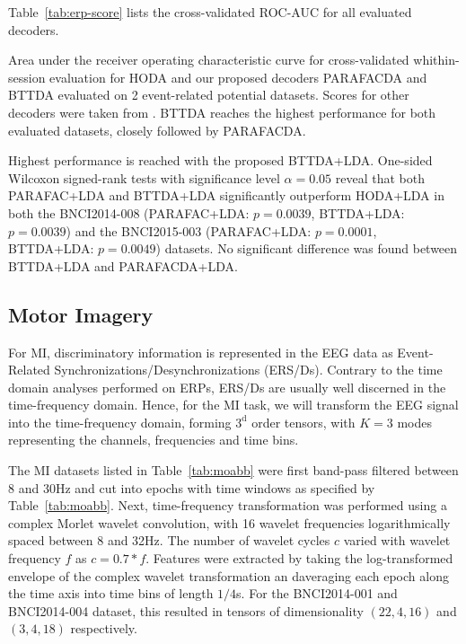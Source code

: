 Table~\ref{tab:erp-score} lists the cross-validated ROC-AUC for all evaluated
decoders.
\begin{table}[t]
	\footnotesize
	\centering
	
  \caption[Whithin-session classification score for 2 event-related potential
  datasets.]{Area under the receiver operating characteristic curve for
		cross-validated whithin-session evaluation for HODA and our proposed decoders
		PARAFACDA and BTTDA evaluated on 2 event-related potential datasets.
    Scores for other decoders were taken from \cite{Chevallier2024}.
		BTTDA reaches the highest performance for both evaluated datasets, closely
		followed by PARAFACDA.
	}
	\label{tab:erp-score}
\end{table}
Highest performance is reached with the proposed BTTDA+LDA.
One-sided Wilcoxon signed-rank tests with significance level $\alpha=0.05$ reveal that both PARAFAC+LDA and BTTDA+LDA
significantly outperform HODA+LDA in both the BNCI2014-008 (PARAFAC+LDA:
$p=0.0039$, BTTDA+LDA: $p=0.0039$) and the BNCI2015-003 (PARAFAC+LDA:
$p=0.0001$, BTTDA+LDA: $p=0.0049$) datasets.
No significant difference was found between BTTDA+LDA and PARAFACDA+LDA.

\subsection{Motor Imagery}
For MI, discriminatory information is represented in the EEG data as
Event-Related Synchronizations/Desynchronizations (ERS/Ds).
Contrary to the time domain analyses performed on ERPs, ERS/Ds are usually well
discerned in the time-frequency domain.
Hence, for the MI task, we will transform the EEG signal into the
time-frequency domain, forming $3^\text{d}$ order tensors, with $K=3$ modes
representing the channels, frequencies and time bins.

The MI datasets listed in Table~\ref{tab:moabb} were first band-pass filtered
between 8 and 30Hz and cut into
epochs with time windows as specified by Table~\ref{tab:moabb}.
Next, time-frequency transformation was performed using a complex Morlet wavelet
convolution, with 16 wavelet frequencies logarithmically spaced between 8 and
32Hz.
The number of wavelet cycles $c$ varied with wavelet frequency $f$ as
$c=0.7*f$.
Features were extracted by taking the log-transformed envelope of the complex
wavelet transformation an daveraging each epoch along the time axis into time bins of
length $1/4$s.
For the BNCI2014-001 and BNCI2014-004 dataset, this resulted in tensors of dimensionality
$(22, 4, 16)$ and  $(3, 4, 18)$
respectively.

